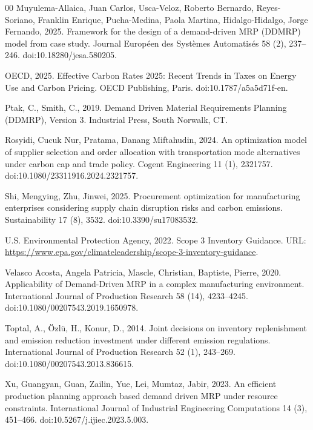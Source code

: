 \documentclass[preprint,12pt,authoryear]{elsarticle}
\begin{document}
\begin{thebibliography}{00}
Muyulema-Allaica, Juan Carlos, Usca-Veloz, Roberto Bernardo, Reyes-Soriano, Franklin Enrique, Pucha-Medina, Paola Martina,
Hidalgo-Hidalgo, Jorge Fernando, 2025. Framework for the design of a demand-driven MRP (DDMRP)
model from case study. Journal Européen des Systèmes Automatisés 58 (2), 237--246.
doi:10.18280/jesa.580205.

OECD, 2025. Effective Carbon Rates 2025: Recent Trends in Taxes on Energy Use and
Carbon Pricing. OECD Publishing, Paris. doi:10.1787/a5a5d71f-en.

Ptak, C., Smith, C., 2019. Demand Driven Material Requirements Planning (DDMRP),
Version 3. Industrial Press, South Norwalk, CT.

Rosyidi, Cucuk Nur, Pratama, Danang Miftahudin, 2024. An optimization model of supplier selection and
order allocation with transportation mode alternatives under carbon cap and trade policy.
Cogent Engineering 11 (1), 2321757. doi:10.1080/23311916.2024.2321757.

Shi, Mengying, Zhu, Jinwei, 2025. Procurement optimization for manufacturing enterprises
considering supply chain disruption risks and carbon emissions. Sustainability 17
(8), 3532. doi:10.3390/su17083532.

U.S. Environmental Protection Agency, 2022. Scope 3 Inventory Guidance. URL:
\url{https://www.epa.gov/climateleadership/scope-3-inventory-guidance}.

Velasco Acosta, Angela Patricia, Mascle, Christian, Baptiste, Pierre, 2020. Applicability of Demand-Driven
MRP in a complex manufacturing environment. International Journal of Production
Research 58 (14), 4233--4245. doi:10.1080/00207543.2019.1650978.

Toptal, A., \"{O}zl\"{u}, H., Konur, D., 2014. Joint decisions on inventory replenishment
and emission reduction investment under different emission regulations. International
Journal of Production Research 52 (1), 243--269. doi:10.1080/00207543.2013.836615.

Xu, Guangyan, Guan, Zailin, Yue, Lei, Mumtaz, Jabir, 2023. An efficient production planning approach
based demand driven MRP under resource constraints. International Journal of
Industrial Engineering Computations 14 (3), 451--466. doi:10.5267/j.ijiec.2023.5.003.


\end{thebibliography}
\end{document}
